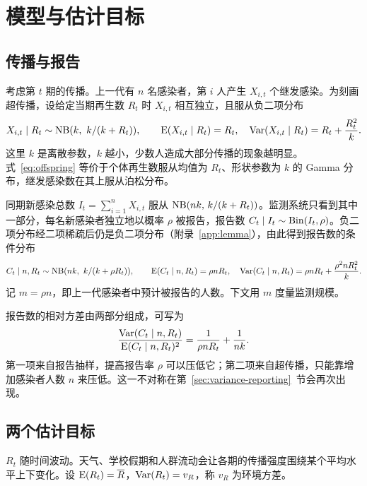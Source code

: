 \section{模型与估计目标}
\label{sec:model}

\subsection{传播与报告}
\label{sec:model-transmission}

考虑第 $t$ 期的传播。上一代有 $n$ 名感染者，第 $i$ 人产生 $X_{i,t}$ 个继发感染。为刻画超传播，设给定当期再生数 $R_t$ 时 $X_{i,t}$ 相互独立，且服从负二项分布
\begin{equation}
  X_{i,t}\mid R_t \sim \operatorname{NB}(k,\ k/(k+R_t)),\qquad
  \operatorname{E}(X_{i,t}\mid R_t)=R_t,\quad \operatorname{Var}(X_{i,t}\mid R_t)=R_t+\frac{R_t^2}{k}.
  \label{eq:offspring}
\end{equation}
这里 $k$ 是离散参数，$k$ 越小，少数人造成大部分传播的现象越明显。式~\eqref{eq:offspring} 等价于个体再生数服从均值为 $R_t$、形状参数为 $k$ 的 Gamma 分布，继发感染数在其上服从泊松分布\citep{lloydsmith2005superspreading}。

同期新感染总数 $I_t=\sum_{i=1}^{n}X_{i,t}$ 服从 $\operatorname{NB}(nk,\,k/(k+R_t))$。监测系统只看到其中一部分，每名新感染者独立地以概率 $\rho$ 被报告，报告数 $C_t\mid I_t\sim\operatorname{Bin}(I_t,\rho)$。负二项分布经二项稀疏后仍是负二项分布（附录~\ref{app:lemma}），由此得到报告数的条件分布
\begin{equation}
  C_t\mid n, R_t \sim \operatorname{NB}(nk,\ k/(k+\rho R_t)),\qquad
  \operatorname{E}(C_t\mid n,R_t)=\rho n R_t,\quad
  \operatorname{Var}(C_t\mid n,R_t)=\rho n R_t+\frac{\rho^2 n R_t^2}{k}.
  \label{eq:report-dist}
\end{equation}
记 $m=\rho n$，即上一代感染者中预计被报告的人数。下文用 $m$ 度量监测规模。

报告数的相对方差由两部分组成，可写为
\begin{equation}
  \frac{\operatorname{Var}(C_t\mid n,R_t)}{\operatorname{E}(C_t\mid n,R_t)^2}=\frac{1}{\rho n R_t}+\frac{1}{nk}.
  \label{eq:relvar}
\end{equation}
第一项来自报告抽样，提高报告率 $\rho$ 可以压低它；第二项来自超传播，只能靠增加感染者人数 $n$ 来压低。这一不对称在第~\ref{sec:variance-reporting}~节会再次出现。

\subsection{两个估计目标}
\label{sec:model-targets}

$R_t$ 随时间波动。天气、学校假期和人群流动会让各期的传播强度围绕某个平均水平上下变化。设 $\operatorname{E}(R_t)=\overline{R}$，$\operatorname{Var}(R_t)=v_R$，称 $v_R$ 为环境方差。

